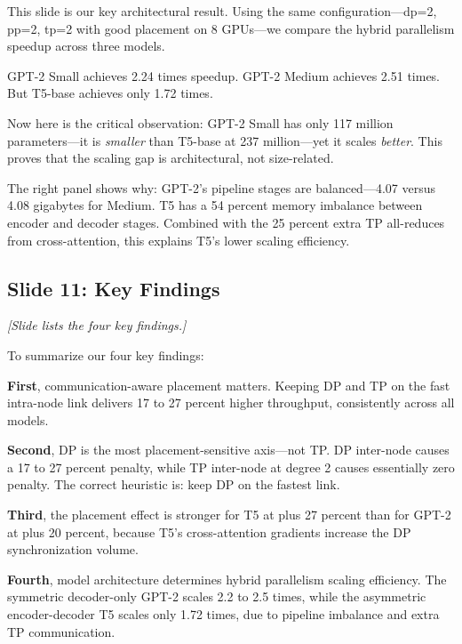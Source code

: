 \documentclass[11pt, a4paper]{article}
\begin{document}
This slide is our key architectural result. Using the same configuration---dp=2, pp=2, tp=2 with good placement on 8 GPUs---we compare the hybrid parallelism speedup across three models.

GPT-2 Small achieves 2.24 times speedup. GPT-2 Medium achieves 2.51 times. But T5-base achieves only 1.72 times.

Now here is the critical observation: GPT-2 Small has only 117 million parameters---it is \textit{smaller} than T5-base at 237 million---yet it scales \textit{better}. This proves that the scaling gap is architectural, not size-related.

The right panel shows why: GPT-2's pipeline stages are balanced---4.07 versus 4.08 gigabytes for Medium. T5 has a 54 percent memory imbalance between encoder and decoder stages. Combined with the 25 percent extra TP all-reduces from cross-attention, this explains T5's lower scaling efficiency.

\subsection{Slide 11: Key Findings}
\textit{[Slide lists the four key findings.]}

To summarize our four key findings:

\textbf{First}, communication-aware placement matters. Keeping DP and TP on the fast intra-node link delivers 17 to 27 percent higher throughput, consistently across all models.

\textbf{Second}, DP is the most placement-sensitive axis---not TP. DP inter-node causes a 17 to 27 percent penalty, while TP inter-node at degree 2 causes essentially zero penalty. The correct heuristic is: keep DP on the fastest link.

\textbf{Third}, the placement effect is stronger for T5 at plus 27 percent than for GPT-2 at plus 20 percent, because T5's cross-attention gradients increase the DP synchronization volume.

\textbf{Fourth}, model architecture determines hybrid parallelism scaling efficiency. The symmetric decoder-only GPT-2 scales 2.2 to 2.5 times, while the asymmetric encoder-decoder T5 scales only 1.72 times, due to pipeline imbalance and extra TP communication.

\end{document}
